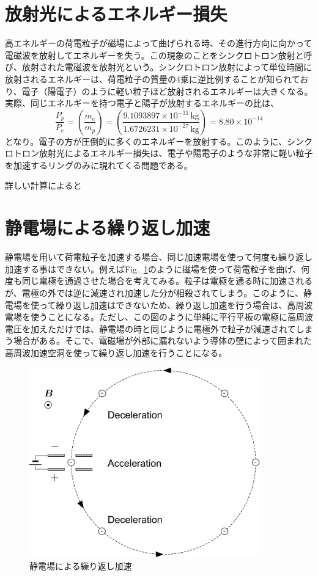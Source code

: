\documentclass[10pt,a4paper]{ltjsarticle}
\begin{document}
\section{放射光によるエネルギー損失}
高エネルギーの荷電粒子が磁場によって曲げられる時、その進行方向に向かって電磁波を放射してエネルギーを失う。この現象のことをシンクロトロン放射と呼び、放射された電磁波を放射光という。シンクロトロン放射によって単位時間に放射されるエネルギーは、荷電粒子の質量の4乗に逆比例することが知られており、電子（陽電子）のように軽い粒子ほど放射されるエネルギーは大きくなる。実際、同じエネルギーを持つ電子と陽子が放射するエネルギーの比は、
%
\begin{equation}
  \frac{P_{p}}{P_{e}} = \left(\frac{m_e}{m_p}\right)=\left(\frac{9.1093897\times 10^{-31}\,\mathrm{kg}}{1.6726231\times 10^{-27}\,\mathrm{kg}}\right)=8.80\times 10^{-14}
  \label{eq4}
\end{equation}
%
となり。電子の方が圧倒的に多くのエネルギーを放射する。このように、シンクロトロン放射光によるエネルギー損失は、電子や陽電子のような非常に軽い粒子を加速するリングのみに現れてくる問題である。

詳しい計算によると

\section{静電場による繰り返し加速}
静電場を用いて荷電粒子を加速する場合、同じ加速電場を使って何度も繰り返し加速する事はできない。例えばFig.~\ref{dc_circular}のように磁場を使って荷電粒子を曲げ、何度も同じ電極を通過させた場合を考えてみる。粒子は電極を通る時に加速されるが、電極の外では逆に減速され加速した分が相殺されてしまう。このように、静電場を使って繰り返し加速はできないため、繰り返し加速を行う場合は、高周波電場を使うことになる。ただし、この図のように単純に平行平板の電極に高周波電圧を加えただけでは、静電場の時と同じように電極外で粒子が減速されてしまう場合がある。そこで、電磁場が外部に漏れないよう導体の壁によって囲まれた高周波加速空洞を使って繰り返し加速を行うことになる。
%
\begin{figure}[hbt]
  \begin{center}
    \includegraphics[width=10cm,clip]{figs/dc_circular.pdf}
    \caption{静電場による繰り返し加速}
   \label{dc_circular}
  \end{center}
\end{figure}
\end{document}
